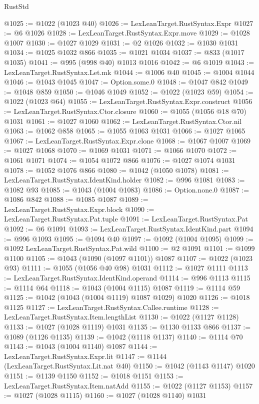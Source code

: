 \begin{lexlean}{RustStd}
\begin{coremodule}
{\begin{coremodule}
{{{{{{{{{{{{{{{{{{{{{{{{{{@1025 := @1022 (@1023 @40)
@1026 := LexLeanTarget.RustSyntax.Expr
@1027 := @6 @1026
@1028 := LexLeanTarget.RustSyntax.Expr.move
@1029 := @1028 @1007
@1030 := @1027 @1029
@1031 := @2 @1026
@1032 := @1030 @1031
@1034 := @1025 @1032 @866
@1035 := @1021 @1034
@1037 := @833 (@1017 @1035)
@1041 := @995 (@998 @40) @1013 @1016
@1042 := @6 @1019
@1043 := LexLeanTarget.RustSyntax.Let.mk
@1044 := @1006 @40
@1045 := @1004 @1044
@1046 := @1043 @1045
@1047 := Option.some.{0}
@1048 := @1047 @842
@1049 := @1048 @859
@1050 := @1046 @1049
@1052 := @1022 (@1023 @59)
@1054 := @1022 (@1023 @64)
@1055 := LexLeanTarget.RustSyntax.Expr.construct
@1056 := LexLeanTarget.RustSyntax.Ctor.closure
@1060 := @1055 (@1056 @18 @70) @1031
@1061 := @1027 @1060
@1062 := LexLeanTarget.RustSyntax.Ctor.nil
@1063 := @1062 @858
@1065 := @1055 @1063 @1031
@1066 := @1027 @1065
@1067 := LexLeanTarget.RustSyntax.Expr.clone
@1068 := @1067 @1007
@1069 := @1027 @1068
@1070 := @1069 @1031
@1071 := @1066 @1070
@1072 := @1061 @1071
@1074 := @1054 @1072 @866
@1076 := @1027 @1074 @1031
@1078 := @1052 @1076 @866
@1080 := @1042 (@1050 @1078)
@1081 := LexLeanTarget.RustSyntax.IdentKind.holder
@1082 := @996 @1081
@1083 := @1082 @93
@1085 := @1043 (@1004 @1083)
@1086 := Option.none.{0}
@1087 := @1086 @842
@1088 := @1085 @1087
@1089 := LexLeanTarget.RustSyntax.Expr.block
@1090 := LexLeanTarget.RustSyntax.Pat.tuple
@1091 := LexLeanTarget.RustSyntax.Pat
@1092 := @6 @1091
@1093 := LexLeanTarget.RustSyntax.IdentKind.part
@1094 := @996 @1093
@1095 := @1094 @40
@1097 := @1092 (@1004 @1095)
@1099 := @1092 LexLeanTarget.RustSyntax.Pat.wild
@1100 := @2 @1091
@1101 := @1099 @1100
@1105 := @1043 (@1090 (@1097 @1101)) @1087
@1107 := @1022 (@1023 @93)
@1111 := @1055 (@1056 @40 @98) @1031
@1112 := @1027 @1111
@1113 := LexLeanTarget.RustSyntax.IdentKind.operand
@1114 := @996 @1113
@1115 := @1114 @64
@1118 := @1043 (@1004 @1115) @1087
@1119 := @1114 @59
@1125 := @1042 (@1043 (@1004 @1119) @1087 @1029) @1020
@1126 := @1018 @1125
@1127 := LexLeanTarget.RustSyntax.Callee.runtime
@1128 := LexLeanTarget.RustSyntax.Item.lengthList
@1130 := @1022 (@1127 @1128)
@1133 := @1027 (@1028 @1119) @1031
@1135 := @1130 @1133 @866
@1137 := @1089 (@1126 @1135)
@1139 := @1042 (@1118 @1137)
@1140 := @1114 @70
@1143 := @1043 (@1004 @1140) @1087
@1144 := LexLeanTarget.RustSyntax.Expr.lit
@1147 := @1144 (LexLeanTarget.RustSyntax.Lit.nat @40)
@1150 := @1042 (@1143 @1147) @1020
@1151 := @1139 @1150
@1152 := @1018 @1151
@1153 := LexLeanTarget.RustSyntax.Item.natAdd
@1155 := @1022 (@1127 @1153)
@1157 := @1027 (@1028 @1115)
@1160 := @1027 (@1028 @1140) @1031
}}}}}}}}}}}}}}}}}}}}}}}}}}
\end{coremodule}}
\end{coremodule}
\end{lexlean}
